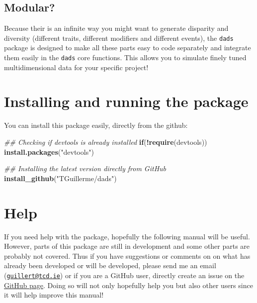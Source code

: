 \documentclass[]{book}
\newenvironment{Shaded}{\begin{snugshade}}{\end{snugshade}}
\newcommand{\CommentTok}[1]{\textcolor[rgb]{0.56,0.35,0.01}{\textit{#1}}}
\newcommand{\ControlFlowTok}[1]{\textcolor[rgb]{0.13,0.29,0.53}{\textbf{#1}}}
\newcommand{\KeywordTok}[1]{\textcolor[rgb]{0.13,0.29,0.53}{\textbf{#1}}}
\newcommand{\NormalTok}[1]{#1}
\newcommand{\OperatorTok}[1]{\textcolor[rgb]{0.81,0.36,0.00}{\textbf{#1}}}
\newcommand{\StringTok}[1]{\textcolor[rgb]{0.31,0.60,0.02}{#1}}
\begin{document}
\hypertarget{modular}{%
\subsection{Modular?}\label{modular}}

Because their is an infinite way you might want to generate disparity and diversity (different traits, different modifiers and different events), the \texttt{dads} package is designed to make all these parts easy to code separately and integrate them easily in the \texttt{dads} core functions.
This allows you to simulate finely tuned multidimensional data for your specific project!

\hypertarget{installing-and-running-the-package}{%
\section{Installing and running the package}\label{installing-and-running-the-package}}

You can install this package easily, directly from the github:

\begin{Shaded}
\begin{Highlighting}[]
\CommentTok{## Checking if devtools is already installed}
\ControlFlowTok{if}\NormalTok{(}\OperatorTok{!}\KeywordTok{require}\NormalTok{(devtools)) }\KeywordTok{install.packages}\NormalTok{(}\StringTok{"devtools"}\NormalTok{)}

\CommentTok{## Installing the latest version directly from GitHub}
\KeywordTok{install_github}\NormalTok{(}\StringTok{"TGuillerme/dads"}\NormalTok{)}
\end{Highlighting}
\end{Shaded}

\hypertarget{help}{%
\section{Help}\label{help}}

If you need help with the package, hopefully the following manual will be useful.
However, parts of this package are still in development and some other parts are probably not covered.
Thus if you have suggestions or comments on on what has already been developed or will be developed, please send me an email (\href{mailto:guillert@tcd.ie}{\nolinkurl{guillert@tcd.ie}}) or if you are a GitHub user, directly create an issue on the \href{https://github.com/TGuillerme/dads}{GitHub page}.
Doing so will not only hopefully help you but also other users since it will help improve this manual!
\end{document}
